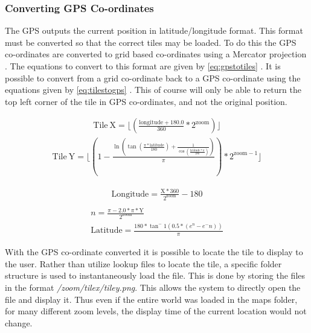 
\subsubsection{Converting GPS Co-ordinates}

The GPS outputs the current position in latitude/longitude format. This format must be converted so that the correct tiles may be loaded. To do this the GPS co-ordinates are converted to grid based co-ordinates using a Mercator projection \cite{slippy_map_tilenames}. The equations to convert to this format are given by \ref{eq:gpstotiles} \cite{slippy_map_tilenames}. It is possible to convert from a grid co-ordinate back to a GPS co-ordinate using the equations given by \ref{eq:tilestogps} \cite{slippy_map_tilenames}. This of course will only be able to return the top left corner of the tile in GPS co-ordinates, and not the original position.

\begin{align}
\label{eq:gpstotiles}
\mathrm{Tile\ X} = \lfloor(\frac{\mathrm{longitude}+180.0}{360}* 2^{\mathrm{zoom}})\rfloor 
\end{align}
\begin{align}
\mathrm{Tile\ Y} = \lfloor{{\left(1- \frac{\ln \left(\tan(\frac{\pi*\mathrm{latitude}}{180})+\frac{1}{\cos(\frac{\mathrm{latitude}*\pi}{180})}\right)}{\pi} \right  )}*2^{\mathrm{zoom}-1}}\rfloor
\end{align}

\begin{align}
\label{eq:tilestogps}
\mathrm{Longitude} = \frac{\mathrm{X}*360}{2^{\mathrm{zoom}}} -180 \\
\end{align}
\begin{align}
n = \frac{ \pi- 2.0*\pi*\mathrm{Y}}{2^{\mathrm{zoom}}} \\
\mathrm{Latitude} = \frac{180*\tan^-1(0.5*(e^n-e^-n))}{\pi} 
\end{align}

With the GPS co-ordinate converted it is possible to locate the tile to display to the user. Rather than utilize lookup files to locate the tile, a specific folder structure is used to instantaneously load the file. This is done by storing the files in the format \emph{/zoom/tilex/tiley.png}. This allows the system to directly open the file and display it. Thus even if the entire world was loaded in the maps folder, for many different zoom levels, the display time of the current location would not change.

